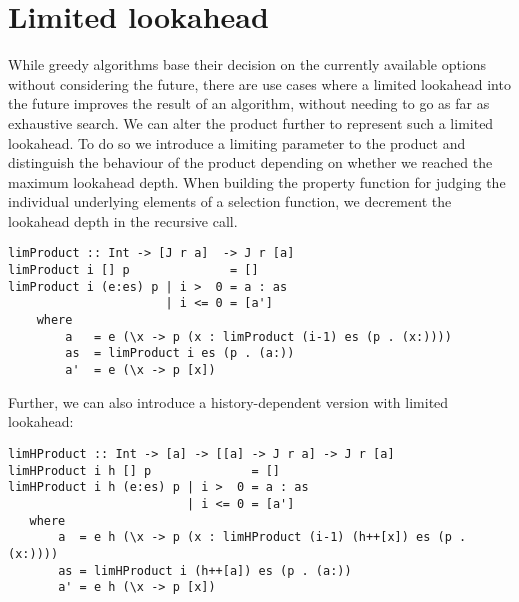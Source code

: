 \documentclass[runningheads]{llncs}
\begin{document}
\section{Limited lookahead}
\label{Limited lookahead}
While greedy algorithms base their decision on the currently available options without considering the future, there are use cases where a limited lookahead into the future improves the result of an algorithm, without needing to go as far as exhaustive search. We can alter the product further to represent such a limited lookahead. 
To do so we introduce a limiting parameter to the product and distinguish the behaviour of the product depending on whether we reached the maximum lookahead depth. When building the property function for judging the individual underlying elements of a selection function, we decrement the lookahead depth in the recursive call. 
\begin{verbatim}
limProduct :: Int -> [J r a]  -> J r [a]
limProduct i [] p              = []
limProduct i (e:es) p | i >  0 = a : as
                      | i <= 0 = [a']
    where
        a   = e (\x -> p (x : limProduct (i-1) es (p . (x:))))
        as  = limProduct i es (p . (a:))
        a'  = e (\x -> p [x])
\end{verbatim}
Further, we can also introduce a history-dependent version with limited lookahead:
\begin{verbatim}
limHProduct :: Int -> [a] -> [[a] -> J r a] -> J r [a]
limHProduct i h [] p              = []
limHProduct i h (e:es) p | i >  0 = a : as
                         | i <= 0 = [a']
   where
       a  = e h (\x -> p (x : limHProduct (i-1) (h++[x]) es (p . (x:))))
       as = limHProduct i (h++[a]) es (p . (a:))
       a' = e h (\x -> p [x])
\end{verbatim}
\end{document}
